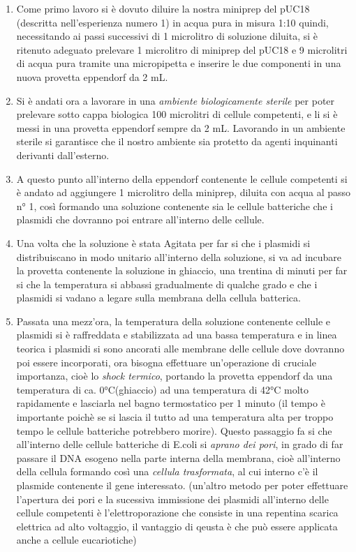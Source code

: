 \documentclass{article}
\begin{document}
\begin{enumerate}

\item Come primo lavoro si è dovuto diluire la nostra miniprep del pUC18 (descritta nell'esperienza numero 1) in acqua pura in misura 1:10 quindi, necessitando ai passi successivi di 1 microlitro di soluzione diluita, si è ritenuto adeguato prelevare 1 microlitro  di miniprep del pUC18 e 9 microlitri  di acqua pura tramite una micropipetta e inserire le due componenti in una nuova provetta eppendorf da 2 mL.


\item Si è andati ora a lavorare in una \textit{ambiente biologicamente sterile} per poter prelevare sotto cappa biologica 100 microlitri  di cellule competenti, e li si è messi in una provetta eppendorf sempre da 2 mL.  Lavorando in un ambiente sterile si garantisce che il nostro ambiente sia protetto da agenti inquinanti derivanti dall’esterno.

\item A questo punto all'interno della eppendorf contenente le cellule competenti si è andato ad aggiungere 1  microlitro della miniprep, diluita con acqua al passo n° 1, così formando una soluzione contenente sia le cellule batteriche che i plasmidi che dovranno poi entrare all'interno delle cellule. 

\item Una volta che la soluzione è stata Agitata per far si che i plasmidi si distribuiscano in modo unitario all'interno della soluzione, si va ad incubare la provetta contenente la soluzione in ghiaccio, una trentina di minuti per far si che la temperatura si abbassi gradualmente di qualche grado e che i plasmidi si vadano a legare sulla membrana della cellula batterica.

\item Passata una mezz'ora, la temperatura della soluzione contenente cellule e plasmidi si è raffreddata e stabilizzata ad una bassa temperatura e in linea teorica i plasmidi si sono ancorati alle membrane delle cellule dove dovranno poi essere incorporati, ora bisogna effettuare un'operazione di cruciale importanza, cioè lo \textit{shock termico}, portando la provetta eppendorf da una temperatura di ca. 0°C(ghiaccio) ad una temperatura di 42°C  molto rapidamente e lasciarla nel bagno termostatico per 1 minuto (il tempo è importante poichè se si lascia il tutto ad una temperatura alta per troppo tempo le cellule batteriche potrebbero morire).  Questo passaggio fa si che all'interno delle cellule batteriche di E.coli si \textit{aprano dei pori}, in grado di far passare il DNA esogeno nella parte interna della membrana, cioè all'interno della cellula formando così una \textit{cellula trasformata}, al cui interno c'è il plasmide contenente il gene interessato. 
(un'altro metodo per poter effettuare l'apertura dei pori e la sucessiva immissione dei plasmidi all'interno delle cellule competenti è l'elettroporazione che consiste in una repentina scarica elettrica ad alto voltaggio, il vantaggio di qeusta è che può essere applicata anche a cellule eucariotiche)


\end{enumerate}
\end{document}
